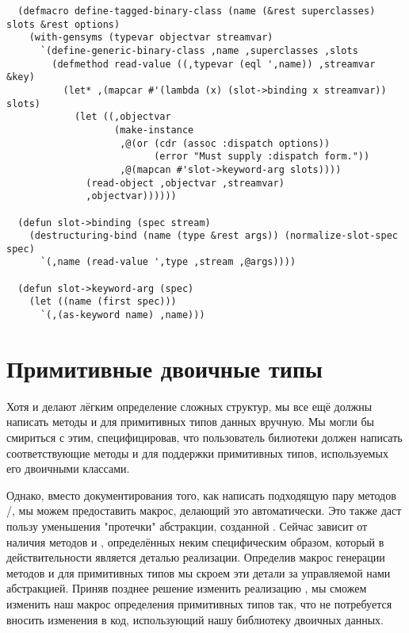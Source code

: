 \begin{lstlisting}
  (defmacro define-tagged-binary-class (name (&rest superclasses) slots &rest options)
    (with-gensyms (typevar objectvar streamvar)
      `(define-generic-binary-class ,name ,superclasses ,slots
        (defmethod read-value ((,typevar (eql ',name)) ,streamvar &key)
          (let* ,(mapcar #'(lambda (x) (slot->binding x streamvar)) slots)
            (let ((,objectvar
                   (make-instance 
                    ,@(or (cdr (assoc :dispatch options))
                          (error "Must supply :dispatch form."))
                    ,@(mapcan #'slot->keyword-arg slots))))
              (read-object ,objectvar ,streamvar)
              ,objectvar))))))

  (defun slot->binding (spec stream)
    (destructuring-bind (name (type &rest args)) (normalize-slot-spec spec)
      `(,name (read-value ',type ,stream ,@args))))

  (defun slot->keyword-arg (spec)
    (let ((name (first spec)))
      `(,(as-keyword name) ,name)))
\end{lstlisting}

\section{Примитивные двоичные типы}

Хотя  и  делают лёгким
определение сложных структур, мы все ещё должны написать методы  и
 для примитивных типов данных вручную. Мы могли бы смириться с этим,
специфицировав, что пользователь билиотеки должен написать соответствующие методы
 и  для поддержки примитивных типов, используемых его
двоичными классами.

Однако, вместо документирования того, как написать подходящую пару методов
/, мы можем предоставить макрос, делающий это
автоматически. Это также даст пользу уменьшения "протечки" абстракции, созданной
. Сейчас  зависит от наличия методов
 и , определённых неким специфическим образом, который
в действительности является деталью реализации. Определив макрос генерации методов
 и  для примитивных типов мы скроем эти детали за
управляемой нами абстракцией. Приняв позднее решение изменить реализацию
, мы сможем изменить наш макрос определения примитивных типов
так, что не потребуется вносить изменения в код, использующий нашу библиотеку двоичных
данных.

